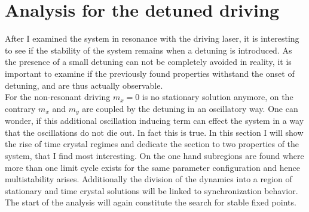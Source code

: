\newpage
\section[Detuned driving]{Analysis for the detuned driving}\label{sec:detuned_analysis}
After I examined the system in resonance with the driving laser, it is interesting to see if the stability of the system remains when a detuning is introduced. As the presence of a small detuning can not be completely avoided in reality, it is important to examine if the previously found properties withstand the onset of detuning, and are thus actually observable.\\
For the non-resonant driving $m_x=0$ is no stationary solution anymore, on the contrary $m_x$ and $m_y$ are coupled by the detuning in an oscillatory way. One can wonder, if this additional oscillation inducing term can effect the system in a way that the oscillations do not die out. In fact this is true. In this section I will show the rise of time crystal regimes and dedicate the section to two properties of the system, that I find most interesting. On the one hand subregions are found where more than one limit cycle exists for the same parameter configuration and hence multistability arises. Additionally the division of the dynamics into a region of stationary and time crystal solutions will be linked to synchronization behavior. The start of the analysis will again constitute the search for stable fixed points.


